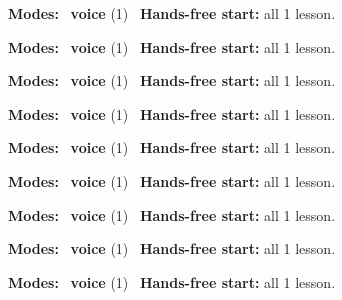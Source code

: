 \expandafter\def\csname hlchaptermodality14\endcsname{%
  {\small\noindent
    \textbf{Modes:} \hlvoicesign{}~\textbf{voice} (1)\quad
    \hlvoicesign{}~\textbf{Hands-free start:} all 1 lesson.%
    \par}\medskip
}

\expandafter\def\csname hlchaptermodality15\endcsname{%
  {\small\noindent
    \textbf{Modes:} \hlvoicesign{}~\textbf{voice} (1)\quad
    \hlvoicesign{}~\textbf{Hands-free start:} all 1 lesson.%
    \par}\medskip
}

\expandafter\def\csname hlchaptermodality16\endcsname{%
  {\small\noindent
    \textbf{Modes:} \hlvoicesign{}~\textbf{voice} (1)\quad
    \hlvoicesign{}~\textbf{Hands-free start:} all 1 lesson.%
    \par}\medskip
}

\expandafter\def\csname hlchaptermodality17\endcsname{%
  {\small\noindent
    \textbf{Modes:} \hlvoicesign{}~\textbf{voice} (1)\quad
    \hlvoicesign{}~\textbf{Hands-free start:} all 1 lesson.%
    \par}\medskip
}

\expandafter\def\csname hlchaptermodality18\endcsname{%
  {\small\noindent
    \textbf{Modes:} \hlvoicesign{}~\textbf{voice} (1)\quad
    \hlvoicesign{}~\textbf{Hands-free start:} all 1 lesson.%
    \par}\medskip
}

\expandafter\def\csname hlchaptermodality19\endcsname{%
  {\small\noindent
    \textbf{Modes:} \hlvoicesign{}~\textbf{voice} (1)\quad
    \hlvoicesign{}~\textbf{Hands-free start:} all 1 lesson.%
    \par}\medskip
}

\expandafter\def\csname hlchaptermodality20\endcsname{%
  {\small\noindent
    \textbf{Modes:} \hlvoicesign{}~\textbf{voice} (1)\quad
    \hlvoicesign{}~\textbf{Hands-free start:} all 1 lesson.%
    \par}\medskip
}

\expandafter\def\csname hlchaptermodality21\endcsname{%
  {\small\noindent
    \textbf{Modes:} \hlvoicesign{}~\textbf{voice} (1)\quad
    \hlvoicesign{}~\textbf{Hands-free start:} all 1 lesson.%
    \par}\medskip
}

\expandafter\def\csname hlchaptermodality22\endcsname{%
  {\small\noindent
    \textbf{Modes:} \hlvoicesign{}~\textbf{voice} (1)\quad
    \hlvoicesign{}~\textbf{Hands-free start:} all 1 lesson.%
    \par}\medskip
}

